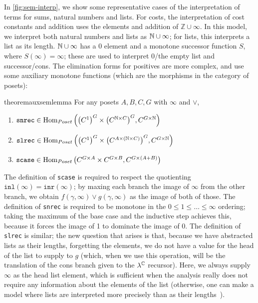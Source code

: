 In \autoref{fig:sem-interp}, we show some representative cases of the
interpretation of terms for sums, natural numbers and lists.  For costs,
the interpretation of cost constants and addition uses the elements and
addition of $\mathbb{Z} \cup \infty$.
In this model, we interpret both natural numbers and
lists as $\mathbb{N} \cup \infty$; for lists, this interprets a list as its
length.  $\mathbb{N} \cup \infty$ has a 0 element and a monotone successor
function $S$, where $S(\infty) = \infty$; these are used to interpret
0/the empty list and successor/cons.
The elimination forms for positives are more complex, and use some
auxiliary monotone functions (which are the morphisms in the category of
posets):
\begin{restatable}{theorem}{auxsemlemma}\label{thm:aux-sem-lemma}
For any posets $A,B,C,G$ with $\infty$ and $\vee$,
\begin{enumerate}
  \item $\texttt{snrec} \in \operatorname{Hom}_{Poset}\left({\left(C^1\right)}^G\times {\left(C^{\ensuremath{\mathbb{N}}\times C}\right)}^G,C^{G\times\mathbb{N}}\right)$
  \item $\texttt{slrec} \in  \operatorname{Hom}_{Poset}\left({\left(C^1\right)^G} \times {\left(C^{A \times (\ensuremath{\mathbb{N}}\times C)}\right)^G},C^{G \times \mathbb{N}}\right)$
  \item $\texttt{scase} \in \operatorname{Hom}_{Poset}\left(C^{G \times A}\times C^{G \times B},C^{G\times(A + B)}\right)$
\end{enumerate}
\end{restatable}


The definition of \texttt{scase} is required to respect the quotienting
$\texttt{inl}(\infty) = \texttt{inr}(\infty)$; by maxing each branch the
image of $\infty$ from the other branch, we obtain $f(\gamma,\infty)
\vee g(\gamma,\infty)$ as the image of both of those.  The definition of
\texttt{snrec} is required to be monotone in the $0 \le 1 \le \ldots \le
\infty$ ordering; taking the maximum of the base case and the inductive
step achieves this, because it forces the image of 1 to dominate the
image of 0.  The definition of \texttt{slrec} is similar; the new
question that arises is that, because we have abstracted lists as their
lengths, forgetting the elements, we do not have a value for the head of
the list to supply to $g$ (which, when we use this operation, will be
the translation of the cons branch given to the $\lambda^{\mathbb{C}}$
recursor).  Here, we always supply $\infty$ as the head list element,
which is sufficient when the analysis really does not require any
information about the elements of the list (otherwise, one can make a
model where lists are interpreted more precisely than as their
lengths~\cite{danner-et-al:icfp15,danner-licata:jfp-in-prep}).

